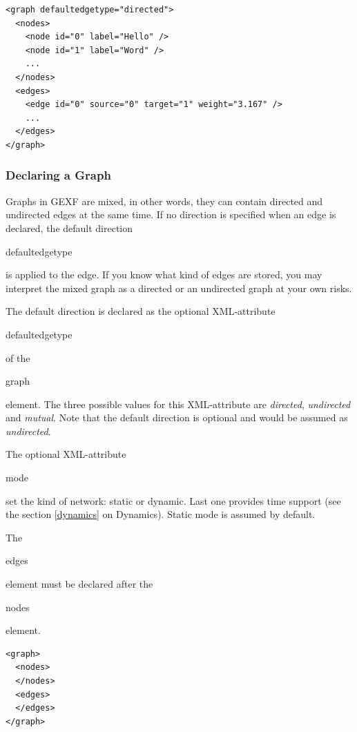 \documentclass[a4paper,10pt]{article}
\begin{document}
\lstset{ style=gexf }
\begin{lstlisting}[caption={The definition of the graph},label=topology]
<graph defaultedgetype="directed">
  <nodes>
    <node id="0" label="Hello" />
    <node id="1" label="Word" />
    ...
  </nodes>
  <edges>
    <edge id="0" source="0" target="1" weight="3.167" />
    ...
  </edges>
</graph>
\end{lstlisting}

\subsubsection{Declaring a Graph}

Graphs in GEXF are mixed, in other words, they can contain directed and undirected edges at the same time. If no direction is specified when an edge is declared, the default direction \begin{footnotesize}defaultedgetype\end{footnotesize} is applied to the edge. If you know what kind of edges are stored, you may interpret the mixed graph as a directed or an undirected graph at your own risks.

The default direction is declared as the optional XML-attribute \begin{footnotesize}defaultedgetype\end{footnotesize} of the \begin{footnotesize}graph\end{footnotesize} element. The three possible values for this XML-attribute are \textit{directed}, \textit{undirected} and \textit{mutual}. Note that the default direction is optional and would be assumed as \textit{undirected}.

The optional XML-attribute \begin{footnotesize}mode\end{footnotesize} set the kind of network: static or dynamic. Last one provides time support (see  the section \ref{dynamics} on Dynamics). Static mode is assumed by default.

The \begin{footnotesize}edges\end{footnotesize} element must be declared after the \begin{footnotesize}nodes\end{footnotesize} element.

\lstset{ style=gexf }
\begin{lstlisting}[caption={An empty graph!},label=aGraph]
<graph>
  <nodes>
  </nodes>
  <edges>
  </edges>
</graph>
\end{lstlisting}
\end{document}
